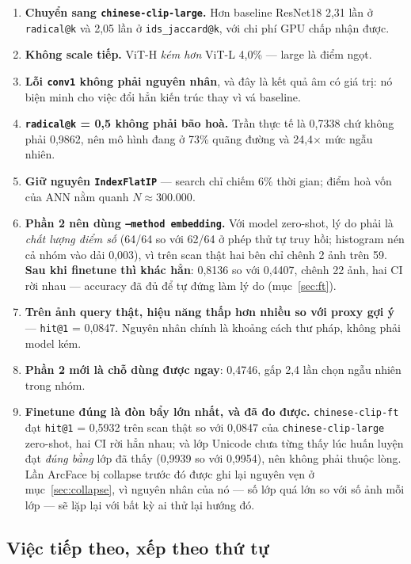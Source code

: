 \documentclass[11pt,a4paper]{article}
\newcommand{\code}[1]{\texttt{#1}}
\begin{document}
\begin{enumerate}
  \item \textbf{Chuyển sang \code{chinese-clip-large}.} Hơn baseline ResNet18 2,31 lần ở
        \code{radical@k} và 2,05 lần ở \code{ids\_jaccard@k}, với chi phí GPU chấp nhận được.
  \item \textbf{Không scale tiếp.} ViT-H \emph{kém hơn} ViT-L 4,0\% --- large là điểm ngọt.
  \item \textbf{Lỗi \code{conv1} không phải nguyên nhân}, và đây là kết quả âm có giá trị: nó biện
        minh cho việc đổi hẳn kiến trúc thay vì vá baseline.
  \item \textbf{\code{radical@k} = 0,5 không phải bão hoà.} Trần thực tế là 0,7338 chứ không phải
        0,9862, nên mô hình đang ở 73\% quãng đường và 24,4$\times$ mức ngẫu nhiên.
  \item \textbf{Giữ nguyên \code{IndexFlatIP}} --- search chỉ chiếm 6\% thời gian; điểm hoà vốn của
        ANN nằm quanh $N \approx 300.000$.
  \item \textbf{Phần 2 nên dùng \code{--method embedding}.} Với model zero-shot, lý do phải là
        \emph{chất lượng điểm số} (64/64 so với 62/64 ở phép thử tự truy hồi; histogram nén cả nhóm
        vào dải 0,003), vì trên scan thật hai bên chỉ chênh 2 ảnh trên 59. \textbf{Sau khi finetune
        thì khác hẳn}: 0,8136 so với 0,4407, chênh 22 ảnh, hai CI rời nhau --- accuracy đã đủ để tự
        đứng làm lý do (mục~\ref{sec:ft}).
  \item \textbf{Trên ảnh query thật, hiệu năng thấp hơn nhiều so với proxy gợi ý} ---
        \code{hit@1} = 0,0847. Nguyên nhân chính là khoảng cách thư pháp, không phải model kém.
  \item \textbf{Phần 2 mới là chỗ dùng được ngay}: 0,4746, gấp 2,4 lần chọn ngẫu nhiên trong nhóm.
  \item \textbf{Finetune đúng là đòn bẩy lớn nhất, và đã đo được.} \code{chinese-clip-ft} đạt
        \code{hit@1} = 0,5932 trên scan thật so với 0,0847 của \code{chinese-clip-large} zero-shot,
        hai CI rời hẳn nhau; và lớp Unicode chưa từng thấy lúc huấn luyện đạt \emph{đúng bằng} lớp
        đã thấy (0,9939 so với 0,9954), nên không phải thuộc lòng. Lần ArcFace bị collapse trước đó
        được ghi lại nguyên vẹn ở mục~\ref{sec:collapse}, vì nguyên nhân của nó --- số lớp quá lớn
        so với số ảnh mỗi lớp --- sẽ lặp lại với bất kỳ ai thử lại hướng đó.
\end{enumerate}

\subsection*{Việc tiếp theo, xếp theo thứ tự}
\end{document}
